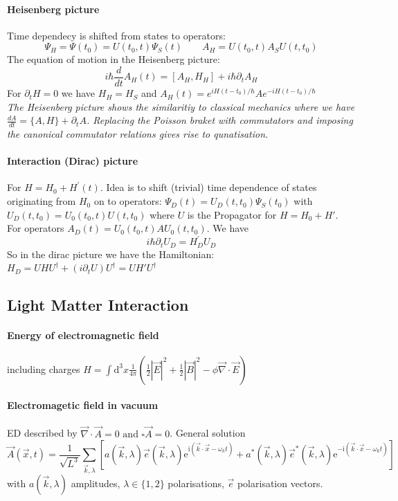 \paragraph{Heisenberg picture} Time dependecy is shifted from states to operators:\\
$$\Psi_H= \Psi(t_0) = U\left(t_0, t\right) \Psi_S(t) \quad \quad A_H=U\left(t_0, t\right) A_S U\left(t, t_0\right)$$
The equation of motion in the Heisenberg picture: 
$$i \hbar \frac{d}{d t} A_H(t) = \left[A_H, H_H\right]+i \hbar \partial_t A_H$$
For $\partial_t H=0$ we have $H_H=H_S$ and $A_H(t)=e^{i H\left(t-t_0\right) / \hbar} A e^{-i H\left(t-t_0\right) / \hbar}$\\
\emph{The Heisenberg picture shows the similaritiy to classical mechanics where we have $\frac{d A}{d t}=\{A, H\}+\partial_t A$.
Replacing the Poisson braket with commutators and imposing the canonical commutator relations gives rise to qunatisation. }

\paragraph{Interaction (Dirac) picture} For $H=H_0+H^{\prime}(t)$. Idea is to shift (trivial) time dependence
of states originating from $H_0$ on to operators: $\Psi_D(t)=U_D\left(t, t_0\right) \Psi_S\left(t_0\right) $ with 
$U_D\left(t, t_0\right)=U_0\left(t_0, t\right) U\left(t, t_0\right)$ where $U$ is the Propagator for $H=H_0 +H'$.\\
For operators $A_D(t)=U_0\left(t_0, t\right) A U_0\left(t, t_0\right)$. We have 
$$i \hbar \partial_t U_D = H_D^{\prime} U_D$$
So in the dirac picture we have the Hamiltonian: $H_D=U H U^{\dagger}+\left(i \partial_t U\right) U^{\dagger} = U H' U^{\dagger} $

\subsection{Light Matter Interaction}

\paragraph{Energy of electromagnetic field} including charges $H=\int \mathrm{d}^3 x \frac{1}{4 \pi}\left(\frac{1}{2}|\vec{E}|^2+\frac{1}{2}|\vec{B}|^2-\phi \vec{\nabla} \cdot \vec{E}\right)$

\paragraph{Electromagetic field in vacuum} ED described by $\vec{\nabla} \cdot \vec{A}=0  \text { and } \square \vec{A}=0$. General solution 
$$\vec{A}(\vec{x}, t)=\frac{1}{\sqrt{L^3}} \sum_{\vec{k}, \lambda}\left[a(\vec{k}, \lambda) \vec{e}(\vec{k}, \lambda) \mathrm{e}^{\mathrm{i}\left(\vec{k} \cdot \vec{x}-\omega_k t\right)}+a^*(\vec{k}, \lambda) \vec{e}^*(\vec{k}, \lambda) \mathrm{e}^{-\mathrm{i}\left(\vec{k} \cdot \vec{x}-\omega_k t\right)}\right]$$
with $a(\vec{k},\lambda)$ amplitudes, $\lambda \in\{1,2\}$ polarisations, $\vec{e}$ polarisation vectors. 

